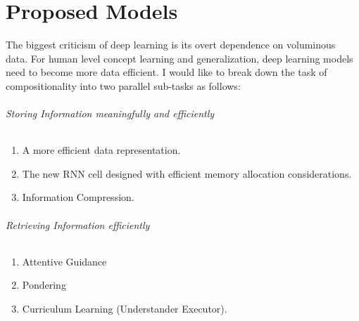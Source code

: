 \chapter{Proposed Models}\label{Chapter:proposals}

The biggest criticism of deep learning is its overt dependence on voluminous data. For human level concept learning and generalization, deep learning models need to become more data efficient. I would like to break down the task of compositionality into two parallel sub-tasks as follows:
\subparagraph{Storing Information meaningfully and efficiently}
\begin{enumerate}
	\item A more efficient data representation.
	\item The new RNN cell designed with efficient memory allocation considerations.
	\item Information Compression.		
\end{enumerate}
\subparagraph{Retrieving Information efficiently}
\begin{enumerate}
	\item Attentive Guidance	
	\item Pondering
	\item Curriculum Learning (Understander Executor).
\end{enumerate}